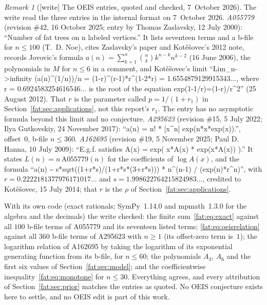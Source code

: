 \documentclass[11pt,letterpaper]{article}
\numberwithin{equation}{section}
\theoremstyle{remark}\newtheorem{remark}[theorem]{Remark}
\begin{document}
\begin{remark}[{[write]} The OEIS entries, quoted and checked, 7~October 2026]\label{fat:rem:oeis}
The write read the three entries in the internal format on 7~October 2026.
\emph{A055779} (revision \#42, 16 October 2025; entry by Thomas Zaslavsky, 12 July 2000): ``Number of fat trees on n labeled vertices.'' It lists seventeen terms and a b-file for $n\le100$ (T.~D. Noe), cites Zaslavsky's paper and Kot\v{e}\v{s}ovec's 2012 note, records Jovovic's formula $a(n)=\sum_{k=1}^n\binom nk k^{n-k}n^{k-2}$ (16 June 2006), the polynomials in $M$ for $n\le6$ in a comment, and Kot\v{e}\v{s}ovec's limit ``Lim\_{n->infinity} (a(n)\^{}(1/n))/n = (1-r)\^{}(r-1)*r\^{}(1-2*r) = 1.6554879129915343..., where r = 0.6924583254616546... is the root of the equation exp(1-1/r)=(1-r)/r\^{}2'' (25 August 2012). That $r$ is the parameter called $p=1/(1+r_1)$ in Section~\ref{fat:sec:applications}, not this report's $r_1$. The entry has no asymptotic formula beyond this limit and no conjecture.
\emph{A295623} (revision \#15, 5 July 2022; Ilya Gutkovskiy, 24 November 2017): ``a(n) = n! * [x\^{}n] exp(n*x*exp(x)).'', offset~$0$, b-file $n\le360$.
\emph{A162695} (revision \#19, 5 November 2025; Paul D. Hanna, 10 July 2009): ``E.g.f. satisfies A(x) = exp( x*A(x) * exp(x*A(x)) ).'' It states $L(n)=n\,\mathrm{A055779}(n)$ for the coefficients of $\log A(x)$, and the formula ``a(n) \textasciitilde{} s*sqrt((1+r*s)/(1+r*s*(3+r*s))) * n\^{}(n-1) / (exp(n)*r\^{}n)'', with $r=0.2222181377976171017\ldots$ and $s=1.998622764215824983\ldots$, credited to Kot\v{e}\v{s}ovec, 15 July 2014; that $r$ is the $\rho$ of Section~\ref{fat:sec:applications}.

With its own code (exact rationals; SymPy~1.14.0 and mpmath~1.3.0 for the algebra and the decimals) the write checked: the finite sum~\eqref{fat:eq:exact} against all $100$ b-file terms of A055779 and its seventeen listed terms; \eqref{fat:eq:oeisrelation} against all $360$ b-file terms of A295623 with $n\ge1$ (its offset-zero term is~$1$); the logarithm relation of A162695 by taking the logarithm of its exponential generating function from its b-file, for $n\le60$; the polynomials $A_3$, $A_6$ and the first six values of Section~\ref{fat:sec:model}; and the coefficientwise inequality~\eqref{fat:eq:monotone} for $n\le30$. Everything agrees, and every attribution of Section~\ref{fat:sec:prior} matches the entries as quoted. No OEIS conjecture exists here to settle, and no OEIS edit is part of this work.
\end{remark}
\end{document}
